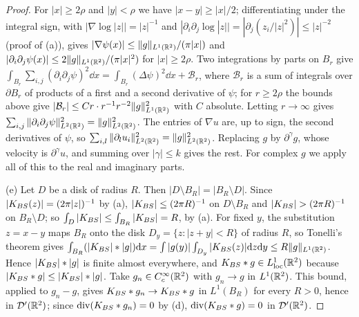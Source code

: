 \begin{proof}
For $|x|\ge2\rho$ and $|y|<\rho$ we have $|x-y|\ge|x|/2$; differentiating under
the integral sign, with $|\nabla\log|z||=|z|^{-1}$ and
$|\partial_i\partial_j\log|z||=|\partial_j(z_i/|z|^2)|\le|z|^{-2}$ (proof of
(a)), gives $|\nabla\psi(x)|\le\|g\|_{L^1(\mathbb{R}^2)}/(\pi|x|)$ and
$|\partial_i\partial_j\psi(x)|\le2\|g\|_{L^1(\mathbb{R}^2)}/(\pi|x|^2)$ for $|x|\ge2\rho$.
Two integrations by parts on $B_r$
give $\int_{B_r}\sum_{i,j}(\partial_i\partial_j\psi)^2\dd x
=\int_{B_r}(\Delta\psi)^2\dd x+\mathcal B_r$, where $\mathcal B_r$ is a sum of
integrals over $\partial B_r$ of products of a first and a second derivative of
$\psi$; for $r\ge2\rho$ the bounds above give
$|\mathcal B_r|\le Cr\cdot r^{-1}r^{-2}\|g\|_{L^1(\mathbb{R}^2)}^2$ with $C$ absolute. Letting
$r\to\infty$ gives $\sum_{i,j}\|\partial_i\partial_j\psi\|_{L^2(\mathbb{R}^2)}^2=\|g\|_{L^2(\mathbb{R}^2)}^2$.
The entries of $\nabla u$ are, up to sign, the second derivatives of $\psi$, so
$\sum_{i,l}\|\partial_lu_i\|_{L^2(\mathbb{R}^2)}^2=\|g\|_{L^2(\mathbb{R}^2)}^2$. Replacing $g$ by
$\partial^\gamma g$, whose velocity is $\partial^\gamma u$, and summing over
$|\gamma|\le k$ gives the rest. For complex $g$ we apply all of this to the
real and imaginary parts.

(e) Let $D$ be a disk of radius $R$. Then $|D\setminus B_R|=|B_R\setminus D|$.
Since $|K_{BS}(z)|=(2\pi|z|)^{-1}$ by (a), $|K_{BS}|\le(2\pi R)^{-1}$ on $D\setminus B_R$
and $|\KBS|>(2\pi R)^{-1}$ on $B_R\setminus D$; so
$\int_D|K_{BS}|\le\int_{B_R}|K_{BS}|=R$, by (a). For fixed $y$, the substitution
$z=x-y$ maps $B_R$ onto the disk $D_y=\{z:|z+y|<R\}$ of radius $R$, so Tonelli's
theorem gives
$\int_{B_R}(|K_{BS}|\ast|g|)\dd x=\int|g(y)|\int_{D_y}|K_{BS}(z)|\dd z\dd y\le R\|g\|_{L^1(\mathbb{R}^2)}$.
Hence $|K_{BS}|\ast|g|$ is finite almost everywhere, and
$K_{BS}\ast g\in L^1_{\mathrm{loc}}(\mathbb{R}^2)$ because $|K_{BS}\ast g|\le|K_{BS}|\ast|g|$.
Take $g_n\in C_c^\infty(\mathbb{R}^2)$ with $g_n\to g$ in $L^1(\mathbb{R}^2)$. This bound, applied to
$g_n-g$, gives $K_{BS}\ast g_n\to K_{BS}\ast g$ in $L^1(B_R)$ for every $R>0$, hence
in $\mathcal D'(\mathbb{R}^2)$; since $\operatorname{div}(K_{BS}\ast g_n)=0$ by (d),
$\operatorname{div}(K_{BS}\ast g)=0$ in $\mathcal D'(\mathbb{R}^2)$.
\end{proof}

